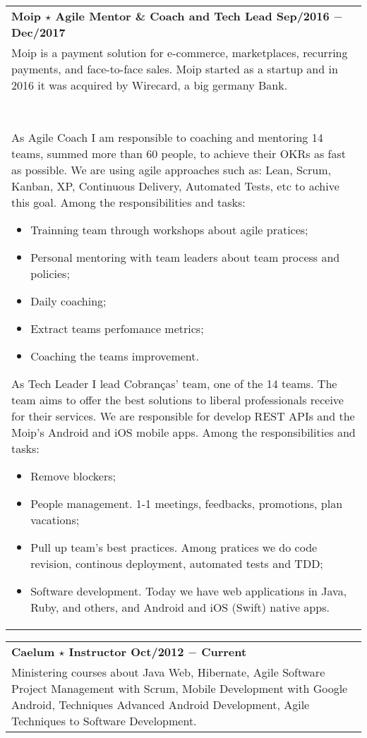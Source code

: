 \documentclass[a4paper, oneside, final]{scrartcl}
\newcommand{\vspc}{\vspace{0.15cm}} %
\begin{document}
\begin{center}
\begin{tabularx}{1\linewidth}{X}
{\bf Moip $\star$ Agile Mentor \& Coach and Tech Lead \hfill Sep/2016 $-$ Dec/2017} \\
Moip is a payment solution for e-commerce, marketplaces, recurring payments, and face-to-face sales. Moip started as a startup and in 2016 it was acquired by Wirecard, a big germany Bank. \\ \ \\

As Agile Coach I am responsible to coaching and mentoring 14 teams, summed more than 60 people, to achieve their OKRs as fast as possible. We are using agile approaches such as: Lean, Scrum, Kanban, XP, Continuous Delivery, Automated Tests, etc to achive this goal. Among the responsibilities and tasks:

\begin{itemize}[noitemsep,topsep=0pt]
  \item Trainning team through workshops about agile pratices;
  \item Personal mentoring with team leaders about team process and policies;
  \item Daily coaching;
  \item Extract teams perfomance metrics;
  \item Coaching the teams improvement.
\end{itemize}

As Tech Leader I lead Cobranças' team, one of the 14 teams. The team aims to offer the best solutions to liberal professionals receive for their services. We are responsible for develop REST APIs and the Moip's Android and iOS mobile apps. Among the responsibilities and tasks:

\begin{itemize}[noitemsep,topsep=0pt]
  \item Remove blockers;
  \item People management. 1-1 meetings, feedbacks, promotions, plan vacations;
  \item Pull up team's best practices. Among pratices we do code revision, continous deployment, automated tests and TDD;
  \item Software development. Today we have web applications in Java, Ruby, and others, and Android and iOS (Swift) native apps.
\end{itemize}

\end{tabularx}

\begin{tabularx}{1\linewidth}{X}
{\bf Caelum $\star$ Instructor \hfill Oct/2012 $-$ Current} \\
Ministering courses about Java Web, Hibernate, Agile Software Project Management with Scrum, Mobile Development with Google Android, Techniques Advanced Android Development, Agile Techniques to Software Development. \vspc\\
\end{tabularx}


\end{center}
\end{document}
